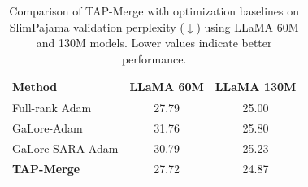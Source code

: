 \begin{table}[t]
\centering\small
\caption{Comparison of TAP-Merge with optimization
baselines on SlimPajama validation perplexity
($\downarrow$) using LLaMA 60M and 130M models.
Lower values indicate better performance.}
\label{tab:slim_ppl}
\begin{tabular}{lcc}
\toprule
Method & LLaMA 60M & LLaMA 130M\\
\midrule
Full-rank Adam & 27.79 & 25.00\\
GaLore-Adam & 31.76 & 25.80\\
GaLore-SARA-Adam & 30.79 & 25.23\\
\midrule
\textbf{TAP-Merge} & 27.72 & 24.87\\ \bottomrule
\end{tabular}
\end{table}

